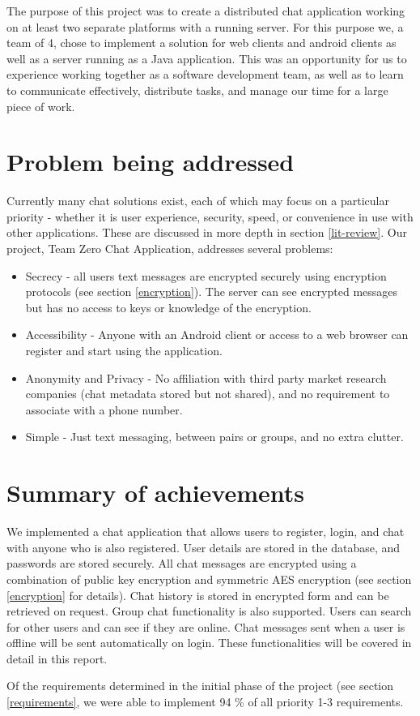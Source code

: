 The purpose of this project was to create a distributed chat application working on at least two separate platforms with a running server. For this purpose we, a team of 4, chose to implement a solution for web clients and android clients as well as a server running as a Java application. This was an opportunity for us to experience working together as a software development team, as well as to learn to communicate effectively, distribute tasks, and manage our time for a large piece of work.

\section{Problem being addressed}

Currently many chat solutions exist, each of which may focus on a particular priority - whether it is user experience, security, speed, or convenience in use with other applications. These are discussed in more depth in section \ref{lit-review}. Our project, Team Zero Chat Application, addresses several problems: 

\begin{itemize}
  \item Secrecy - all users text messages are encrypted securely using encryption protocols (see section \ref{encryption}). The server can see encrypted messages but has no access to keys or knowledge of the encryption.
  \item Accessibility - Anyone with an Android client or access to a web browser can register and start using the application.
  \item Anonymity and Privacy - No affiliation with third party market research companies (chat metadata stored but not shared), and no requirement to associate with a phone number.
  \item Simple - Just text messaging, between pairs or groups, and no extra clutter.
\end{itemize}

\section{Summary of achievements}
\label{summary_achievements}

We implemented a chat application that allows users to register, login, and chat with anyone who is also registered. User details are stored in the database, and passwords are stored securely. All chat messages are encrypted using a combination of public key encryption and symmetric AES encryption (see section \ref{encryption} for details). Chat history is stored in encrypted form and can be retrieved on request. Group chat functionality is also supported. Users can search for other users and can see if they are online. Chat messages sent when a user is offline will be sent automatically on login. These functionalities will be covered in detail in this report.

Of the requirements determined in the initial phase of the project (see section \ref{requirements}, we were able to implement 94 \% of all priority 1-3 requirements.
